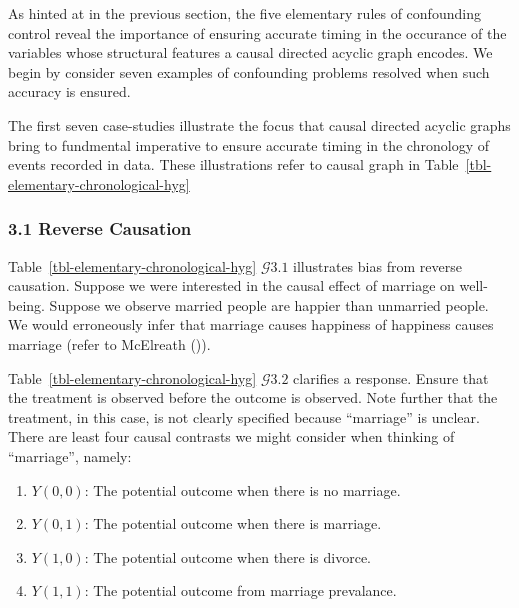 \documentclass[
  single column]{article}
\providecommand{\tightlist}{%
  \setlength{\itemsep}{0pt}\setlength{\parskip}{0pt}}\usepackage{longtable,booktabs,array}
\begin{document}
\begin{table}

\caption{\label{tbl-elementary-chronological-hyg}}

\centering{

\captionsetup{labelsep=none}

\terminologychronologicalhygeine

}

\end{table}%

As hinted at in the previous section, the five elementary rules of
confounding control reveal the importance of ensuring accurate timing in
the occurance of the variables whose structural features a causal
directed acyclic graph encodes. We begin by consider seven examples of
confounding problems resolved when such accuracy is ensured.

The first seven case-studies illustrate the focus that causal directed
acyclic graphs bring to fundmental imperative to ensure accurate timing
in the chronology of events recorded in data. These illustrations refer
to causal graph in Table~\ref{tbl-elementary-chronological-hyg}

\subsubsection{3.1 Reverse Causation}\label{reverse-causation}

Table~\ref{tbl-elementary-chronological-hyg} \(\mathcal{G} 3.1\)
illustrates bias from reverse causation. Suppose we were interested in
the causal effect of marriage on well-being. Suppose we observe married
people are happier than unmarried people. We would erroneously infer
that marriage causes happiness of happiness causes marriage (refer to
McElreath ()).

Table~\ref{tbl-elementary-chronological-hyg} \(\mathcal{G} 3.2\)
clarifies a response. Ensure that the treatment is observed before the
outcome is observed. Note further that the treatment, in this case, is
not clearly specified because ``marriage'' is unclear. There are least
four causal contrasts we might consider when thinking of ``marriage'',
namely:

\begin{enumerate}
\def\labelenumi{\arabic{enumi}.}
\tightlist
\item
  \(Y(0, 0)\): The potential outcome when there is no marriage.
\item
  \(Y(0, 1)\): The potential outcome when there is marriage.
\item
  \(Y(1, 0)\): The potential outcome when there is divorce.
\item
  \(Y(1, 1)\): The potential outcome from marriage prevalance.
\end{enumerate}
\end{document}
